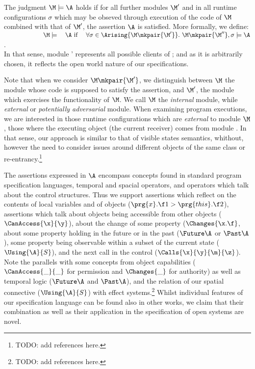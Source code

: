 The judgment $\M \models \A$ holds if for all further modules $\M'$ and in  all runtime configurations $\sigma$ which may be obseved through execution of the code of $\M$ combined with that of $\M'$, the assertion $\A$ is satisfied. More formally, we define:\\
$~ \strut  \hspace{.8in} \M \models \ \ \ \A \mbox{             if               }  \ \ \  \forall \sigma\in\Arising {\M \mkpair  {\M'}}. \ \M \mkpair  {\M''}, \sigma \models \A$.\\
 In that sense, module {\M'}  represents all possible clients of {\M}; and as it is arbitrarily chosen, it reflects the open world nature of our specifications.

Note that when we consider $\M \mkpair  {\M'}$, we distinguish between $\M$ the module whose code  is supposed to satisfy the assertion, and $\M'$, the module which exercises the functionality of $\M$. We call $\M$ the {\em internal} module, while {\em external} or {\em potentially adversarial} module. When examining program executions, we are interested in those runtime configurations which are {\em external} to module $\M$, \ie those where the executing object (\ie the current receiver) comes from module \M. In 
that sense, our approach is similar to that of visible states semantics, whithout, however the need to consider issues
around different objects of the same class or re-entrancy.\footnote{TODO: add references here.}

The assertions expressed in $\A$  encompass concepts found in standard program specification languages, temporal and spacial operators, and operators which talk about the control structures. Thus we support assertions which reflect on the contents of local variables  and of objects  (\eg $\prg{x}.\f1 > \prg{this}.\f2$), assertions which talk about objects being accessible from other objects 
(\eg $\CanAccess{\x}{\y}$), about the change of some property 
(\eg $\Changes{\x.\f}$, about some property   holding in the future   or in the past
(\eg $\Future \A$  or $\Past \A$), some property being observable within a subset of the current state
( $\Using{\A}{S}$), and the next call in the control ($\Calls {\x} {\y} {\m} {\z}$). Note the parallels with 
some concepts from object capabilities ($\CanAccess{\_}{\_}$  for  permission and $\Changes{\_}$ for authority)
as well as temporal logic ($\Future \A$  and $\Past \A$), and the relation of
our spatial connective ($\Using{\A}{S}$)  with effect systems.\footnote{TODO: add references here.}  Whilst   individual 
features of our specification language can  be found also in other works, we claim that their  combination as well as
their application in the specification of open systems are novel.

